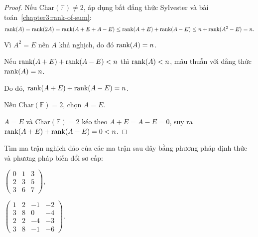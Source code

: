 \documentclass[class=linearalgebra,crop=false]{standalone}
\begin{document}
\begin{proof}
    \par Nếu $\text{Char}(\mathbb{F})\ne 2$, áp dụng bất đẳng thức Sylvester và bài toán~\ref{chapter3:rank-of-sum}:
    \[
        \text{rank}(A) = \text{rank}(2A) = \text{rank}(A+E + A-E) \le \text{rank}(A+E) + \text{rank}(A-E) \le n + \text{rank}(A^{2} - E) = n.
    \]
    \par Vì $A^{2} = E$ nên $A$ khả nghịch, do đó $\text{rank}(A) = n$.
    \par Nếu $\text{rank}(A + E) + \text{rank}(A - E) < n$ thì $\text{rank}(A) < n$, mâu thuẫn với đẳng thức $\text{rank}(A) = n$.
    \par Do đó, $\text{rank}(A + E) + \text{rank}(A - E) = n$.
    \bigskip
    \par Nếu $\text{Char}(\mathbb{F}) = 2$, chọn $A = E$.
    \par $A = E$ và $\text{Char}(\mathbb{F}) = 2$ kéo theo $A + E = A - E = 0$, suy ra $\text{rank}(A + E) + \text{rank}(A - E) = 0 < n$.
\end{proof}

\begin{exercise}
    \par Tìm ma trận nghịch đảo của các ma trận sau đây bằng phương pháp định thức và phương pháp biến đổi sơ cấp:
    \begin{center}
        \begin{enumerate*}[label = (\alph*)]
            \item $\begin{pmatrix}
                    0 & 1 & 3 \\
                    2 & 3 & 5 \\
                    3 & 6 & 7
                \end{pmatrix}$,
            \item $\begin{pmatrix}
                    1 & 2 & -1 & -2 \\
                    3 & 8 & 0  & -4 \\
                    2 & 2 & -4 & -3 \\
                    3 & 8 & -1 & -6
                \end{pmatrix}$.
        \end{enumerate*}
    \end{center}
\end{exercise}
\end{document}
